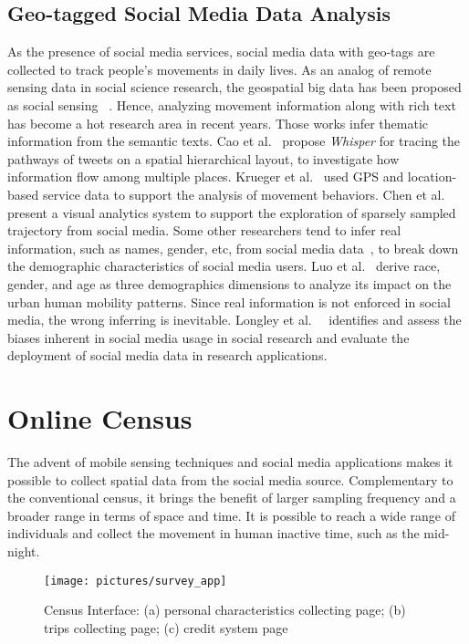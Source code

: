 \subsection{Geo-tagged Social Media Data Analysis}
As the presence of social media services, social media data with geo-tags are collected to track people's movements in daily lives. As an analog of remote sensing data in social science research, the geospatial big data has been proposed as social sensing ~\citep{liu2015social}. Hence, analyzing movement information along with rich text has become a hot research area in recent years. Those works infer thematic information from the semantic texts. Cao et al.~\citep{cao2012whisper} propose \textit{Whisper} for tracing the pathways of tweets on a spatial hierarchical layout, to investigate how information flow among multiple places. Krueger et al.~\citep{krueger2014visual} used GPS and location-based service data to support the analysis of movement behaviors. Chen et al.~\citep{chen2016interactive} present a visual analytics system to support the exploration of sparsely sampled trajectory from social media. Some other researchers tend to infer real information, such as names, gender, etc, from social media data~\citep{peddinti2014internet}, to break down the demographic characteristics of social media users. Luo et al.~\citep{luo2016explore} derive race, gender, and age as three demographics dimensions to analyze its impact on the urban human mobility patterns. Since real information is not enforced in social media, the wrong inferring is inevitable. Longley et al.~\citep{Longley2015}~\citep{Paul2016_twitter} identifies and assess the biases inherent in social media usage in social research and evaluate the deployment of social media data in research applications.

\section{Online Census}
The advent of mobile sensing techniques and social media applications makes it possible to collect spatial data from the social media source. Complementary to the conventional census, it brings the benefit of larger sampling frequency and a broader range in terms of space and time. It is possible to reach a wide range of individuals and collect the movement in human inactive time, such as the mid-night.


\begin{figure}[htb!]
 \centering %
 \texttt{[image: pictures/survey\_app]}
 \caption{Census Interface: (a) personal characteristics collecting page; (b) trips collecting page; (c) credit system page}
 \label{fig:app}
\end{figure}

